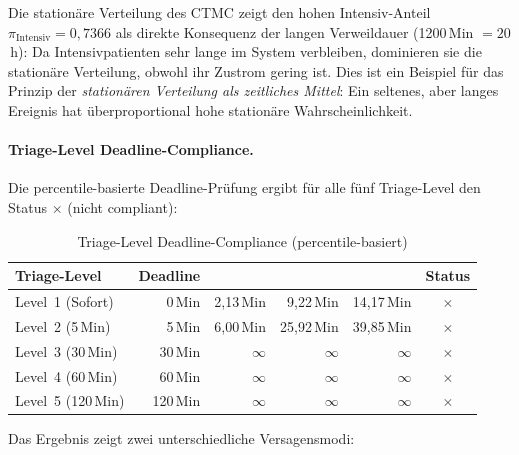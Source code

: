 ﻿\documentclass[a4paper,12pt]{report}
\theoremstyle{definition}
\begin{document}
Die stationäre Verteilung des CTMC zeigt den hohen Intensiv-Anteil
$\pi_\text{Intensiv} = 0{,}7366$ als direkte Konsequenz der langen
Verweildauer (1200\,Min $= 20$\,h): Da Intensivpatienten sehr lange
im System verbleiben, dominieren sie die stationäre Verteilung,
obwohl ihr Zustrom gering ist. Dies ist ein Beispiel für das Prinzip
der \emph{stationären Verteilung als zeitliches Mittel}: Ein seltenes,
aber langes Ereignis hat überproportional hohe stationäre Wahrscheinlichkeit.

\paragraph{Triage-Level Deadline-Compliance.}
Die percentile-basierte Deadline-Prüfung ergibt für alle fünf Triage-Level
den Status $\times$ (nicht compliant):

\begin{table}[H]
	\centering
	\begin{tabular}{@{}lrrrrc@{}}
		\toprule
		\textbf{Triage-Level} & \textbf{Deadline} & \boldmath{$t_{0{,}50}$} &
		\boldmath{$t_{0{,}95}$} & \boldmath{$t_{0{,}99}$} & \textbf{Status} \\
		\midrule
		Level~1 (Sofort)   & 0\,Min  &  2{,}13\,Min &  9{,}22\,Min & 14{,}17\,Min & $\times$ \\
		Level~2 (5\,Min)   & 5\,Min  &  6{,}00\,Min & 25{,}92\,Min & 39{,}85\,Min & $\times$ \\
		Level~3 (30\,Min)  & 30\,Min & $\infty$     & $\infty$     & $\infty$     & $\times$ \\
		Level~4 (60\,Min)  & 60\,Min & $\infty$     & $\infty$     & $\infty$     & $\times$ \\
		Level~5 (120\,Min) &120\,Min & $\infty$     & $\infty$     & $\infty$     & $\times$ \\
		\bottomrule
	\end{tabular}
	\caption{Triage-Level Deadline-Compliance (percentile-basiert)}
	\label{tab:triage-compliance}
\end{table}

Das Ergebnis zeigt zwei unterschiedliche Versagensmodi:
\end{document}
